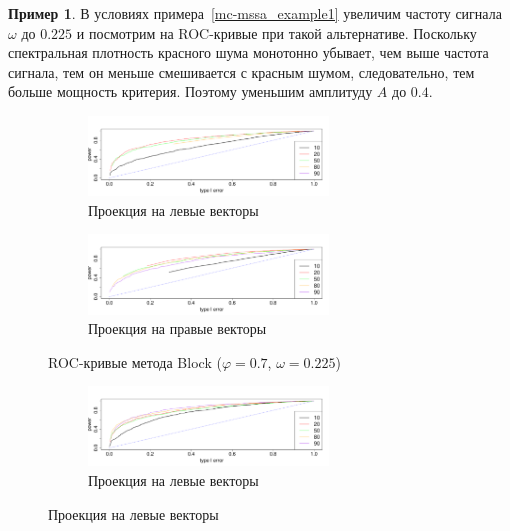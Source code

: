 \documentclass[specialist,
substylefile = spbu_report.rtx,
subf,href,colorlinks=true, 12pt]{disser}
\theoremstyle{definition}
\newtheorem{example}{Пример}
\begin{document}
\begin{example}
	В условиях примера~\ref{mc-mssa_example1} увеличим частоту сигнала $\omega$ до $0.225$ и посмотрим на ROC-кривые при такой альтернативе. Поскольку спектральная плотность красного шума монотонно убывает, чем выше частота сигнала, тем он меньше смешивается с красным шумом, следовательно, тем больше мощность критерия. Поэтому уменьшим амплитуду $A$ до $0.4$.

	\begin{figure}
		\captionsetup[subfigure]{justification=Centering}
		\begin{subfigure}[t]{\textwidth}
			\centering
			\includegraphics[width=0.7\textwidth]{img/roc_block_ev_omega0225.pdf}
			\caption{Проекция на левые векторы}
		\end{subfigure}\hspace{\fill}
		\begin{subfigure}[t]{\textwidth}
			\centering
			\includegraphics[width=0.7\textwidth]{img/roc_block_fa_omega0225.pdf}
			\caption{Проекция на правые векторы}
		\end{subfigure}
		\caption{ROC-кривые метода Block ($\varphi=0.7$, $\omega=0.225$)}
		\label{fig:block_omega0225}
	\end{figure}
	\begin{figure}[h!]
		\captionsetup[subfigure]{justification=Centering}
		\begin{subfigure}[t]{\textwidth}
			\centering
			\includegraphics[width=0.7\textwidth]{img/roc_sum_ev_omega0225.pdf}
			\caption{Проекция на левые векторы}

\end{subfigure}
\end{figure}
\end{example}
\end{document}

